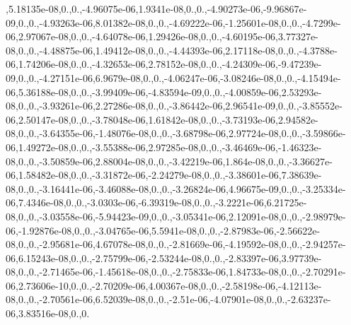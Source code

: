 \begin{DoxyCompactItemize}
,5.\-18135e-\/08,0.,0.,-\/4.\-96075e-\/06,1.\-9341e-\/08,0.,0.,-\/4.\-90273e-\/06,-\/9.\-96867e-\/09,0.,0.,-\/4.\-93263e-\/06,8.\-01382e-\/08,0.,0.,-\/4.\-69222e-\/06,-\/1.\-25601e-\/08,0.,0.,-\/4.\-7299e-\/06,2.\-97067e-\/08,0.,0.,-\/4.\-64078e-\/06,1.\-29426e-\/08,0.,0.,-\/4.\-60195e-\/06,3.\-77327e-\/08,0.,0.,-\/4.\-48875e-\/06,1.\-49412e-\/08,0.,0.,-\/4.\-44393e-\/06,2.\-17118e-\/08,0.,0.,-\/4.\-3788e-\/06,1.\-74206e-\/08,0.,0.,-\/4.\-32653e-\/06,2.\-78152e-\/08,0.,0.,-\/4.\-24309e-\/06,-\/9.\-47239e-\/09,0.,0.,-\/4.\-27151e-\/06,6.\-9679e-\/08,0.,0.,-\/4.\-06247e-\/06,-\/3.\-08246e-\/08,0.,0.,-\/4.\-15494e-\/06,5.\-36188e-\/08,0.,0.,-\/3.\-99409e-\/06,-\/4.\-83594e-\/09,0.,0.,-\/4.\-00859e-\/06,2.\-53293e-\/08,0.,0.,-\/3.\-93261e-\/06,2.\-27286e-\/08,0.,0.,-\/3.\-86442e-\/06,2.\-96541e-\/09,0.,0.,-\/3.\-85552e-\/06,2.\-50147e-\/08,0.,0.,-\/3.\-78048e-\/06,1.\-61842e-\/08,0.,0.,-\/3.\-73193e-\/06,2.\-94582e-\/08,0.,0.,-\/3.\-64355e-\/06,-\/1.\-48076e-\/08,0.,0.,-\/3.\-68798e-\/06,2.\-97724e-\/08,0.,0.,-\/3.\-59866e-\/06,1.\-49272e-\/08,0.,0.,-\/3.\-55388e-\/06,2.\-97285e-\/08,0.,0.,-\/3.\-46469e-\/06,-\/1.\-46323e-\/08,0.,0.,-\/3.\-50859e-\/06,2.\-88004e-\/08,0.,0.,-\/3.\-42219e-\/06,1.\-864e-\/08,0.,0.,-\/3.\-36627e-\/06,1.\-58482e-\/08,0.,0.,-\/3.\-31872e-\/06,-\/2.\-24279e-\/08,0.,0.,-\/3.\-38601e-\/06,7.\-38639e-\/08,0.,0.,-\/3.\-16441e-\/06,-\/3.\-46088e-\/08,0.,0.,-\/3.\-26824e-\/06,4.\-96675e-\/09,0.,0.,-\/3.\-25334e-\/06,7.\-4346e-\/08,0.,0.,-\/3.\-0303e-\/06,-\/6.\-39319e-\/08,0.,0.,-\/3.\-2221e-\/06,6.\-21725e-\/08,0.,0.,-\/3.\-03558e-\/06,-\/5.\-94423e-\/09,0.,0.,-\/3.\-05341e-\/06,2.\-12091e-\/08,0.,0.,-\/2.\-98979e-\/06,-\/1.\-92876e-\/08,0.,0.,-\/3.\-04765e-\/06,5.\-5941e-\/08,0.,0.,-\/2.\-87983e-\/06,-\/2.\-56622e-\/08,0.,0.,-\/2.\-95681e-\/06,4.\-67078e-\/08,0.,0.,-\/2.\-81669e-\/06,-\/4.\-19592e-\/08,0.,0.,-\/2.\-94257e-\/06,6.\-15243e-\/08,0.,0.,-\/2.\-75799e-\/06,-\/2.\-53244e-\/08,0.,0.,-\/2.\-83397e-\/06,3.\-97739e-\/08,0.,0.,-\/2.\-71465e-\/06,-\/1.\-45618e-\/08,0.,0.,-\/2.\-75833e-\/06,1.\-84733e-\/08,0.,0.,-\/2.\-70291e-\/06,2.\-73606e-\/10,0.,0.,-\/2.\-70209e-\/06,4.\-00367e-\/08,0.,0.,-\/2.\-58198e-\/06,-\/4.\-12113e-\/08,0.,0.,-\/2.\-70561e-\/06,6.\-52039e-\/08,0.,0.,-\/2.\-51e-\/06,-\/4.\-07901e-\/08,0.,0.,-\/2.\-63237e-\/06,3.\-83516e-\/08,0.,0.
\end{DoxyCompactItemize}
